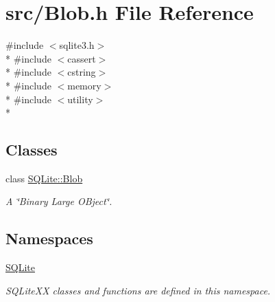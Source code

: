 \hypertarget{a00020}{\section{src/\-Blob.h File Reference}
\label{a00020}
}
{\ttfamily \#include $<$sqlite3.\-h$>$}\\*
{\ttfamily \#include $<$cassert$>$}\\*
{\ttfamily \#include $<$cstring$>$}\\*
{\ttfamily \#include $<$memory$>$}\\*
{\ttfamily \#include $<$utility$>$}\\*
\subsection*{Classes}
\begin{DoxyCompactItemize}
\item 
class \hyperlink{a00002}{S\-Q\-Lite\-::\-Blob}
\begin{DoxyCompactList}\small\item\em A \char`\"{}\-Binary Large O\-Bject\char`\"{}. \end{DoxyCompactList}\end{DoxyCompactItemize}
\subsection*{Namespaces}
\begin{DoxyCompactItemize}
\item 
\hyperlink{a00038}{S\-Q\-Lite}
\begin{DoxyCompactList}\small\item\em S\-Q\-Lite\-X\-X classes and functions are defined in this namespace. \end{DoxyCompactList}\end{DoxyCompactItemize}
